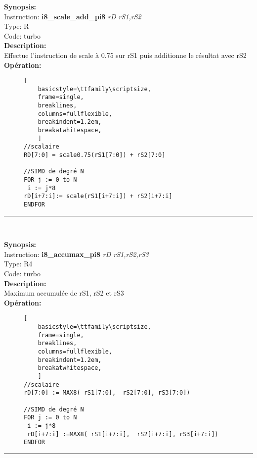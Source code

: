 {\scriptsize
\textbf{Synopsis:}\\
Instruction: \textbf{i8\_scale\_add\_pi8 } \textit{rD rS1,rS2}\\
Type: R\\
Code: turbo\\
\textbf{Description:}\\
Effectue l’instruction de scale à 0.75 sur rS1 puis additionne le résultat avec rS2\\
\textbf{Opération:}\\
    \begin{figure}[H]
    \begin{lstlisting}[
    basicstyle=\ttfamily\scriptsize,
    frame=single,
    breaklines,
    columns=fullflexible,
    breakindent=1.2em,
    breakatwhitespace,
    ]
//scalaire
RD[7:0] = scale0.75(rS1[7:0]) + rS2[7:0] 
    
//SIMD de degré N
FOR j := 0 to N    
 i := j*8    
rD[i+7:i]:= scale(rS1[i+7:i]) + rS2[i+7:i]
ENDFOR
\end{lstlisting}
\end{figure}
}
\rule{8cm}{0.4pt}\\
{\scriptsize
\textbf{Synopsis:}\\
Instruction: \textbf{i8\_accumax\_pi8 } \textit{rD rS1,rS2,rS3}\\
Type: R4\\
Code: turbo\\
\textbf{Description:}\\
Maximum accumulée de rS1, rS2 et rS3\\
\textbf{Opération:}\\
    \begin{figure}[H]
    \begin{lstlisting}[
    basicstyle=\ttfamily\scriptsize,
    frame=single,
    breaklines,
    columns=fullflexible,
    breakindent=1.2em,
    breakatwhitespace,
    ]
//scalaire
rD[7:0] := MAX8( rS1[7:0],  rS2[7:0], rS3[7:0])
    
//SIMD de degré N
FOR j := 0 to N    
 i := j*8    
 rD[i+7:i] :=MAX8( rS1[i+7:i],  rS2[i+7:i], rS3[i+7:i]) 
ENDFOR
\end{lstlisting}
\end{figure}
}
\rule{8cm}{0.4pt}\\
